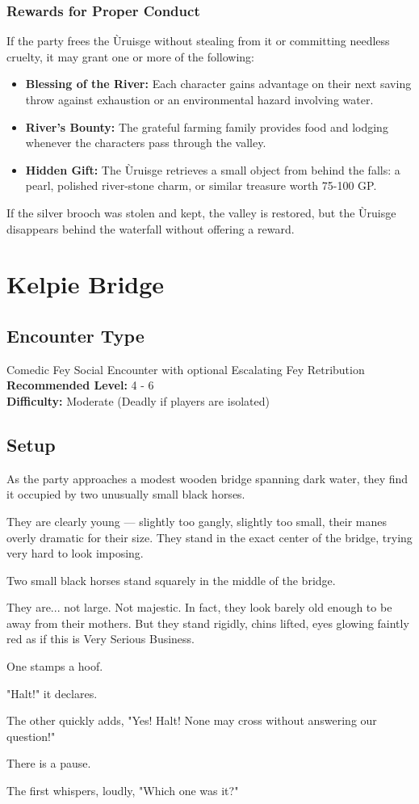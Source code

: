 \subsubsection*{Rewards for Proper Conduct}
{\entryfont If the party frees the Ùruisge without stealing from it or committing needless cruelty, it may grant one or more of the following:
\begin{itemize}
	\item \textbf{Blessing of the River:} Each character gains advantage on their next saving throw against exhaustion or an environmental hazard involving water.
	\item \textbf{River's Bounty:} The grateful farming family provides food and lodging whenever the characters pass through the valley.
	\item \textbf{Hidden Gift:} The Ùruisge retrieves a small object from behind the falls: a pearl, polished river-stone charm, or similar treasure worth 75-100 GP.
\end{itemize}
If the silver brooch was stolen and kept, the valley is restored, but the Ùruisge disappears behind the waterfall without offering a reward.}

\clearpage

\section*{Kelpie Bridge}
\subsection*{Encounter Type}
{\entryfont Comedic Fey Social Encounter with optional Escalating Fey Retribution\\
\textbf{Recommended Level:} 4 - 6\\
\textbf{Difficulty:} Moderate (Deadly if players are isolated)}
\subsection*{Setup}
{\entryfont As the party approaches a modest wooden bridge spanning dark water, they find it occupied by two unusually small black horses.

They are clearly young — slightly too gangly, slightly too small, their manes overly dramatic for their size. They stand in the exact center of the bridge, trying very hard to look imposing.}
\begin{DndReadAloud}
	Two small black horses stand squarely in the middle of the bridge.

	They are... not large. Not majestic. In fact, they look barely old enough to be away from their mothers. But they stand rigidly, chins lifted, eyes glowing faintly red as if this is Very Serious Business.

	One stamps a hoof.

	"Halt!" it declares.

	The other quickly adds, "Yes! Halt! None may cross without answering our question!"

	There is a pause.

	The first whispers, loudly, "Which one was it?"
\end{DndReadAloud}

